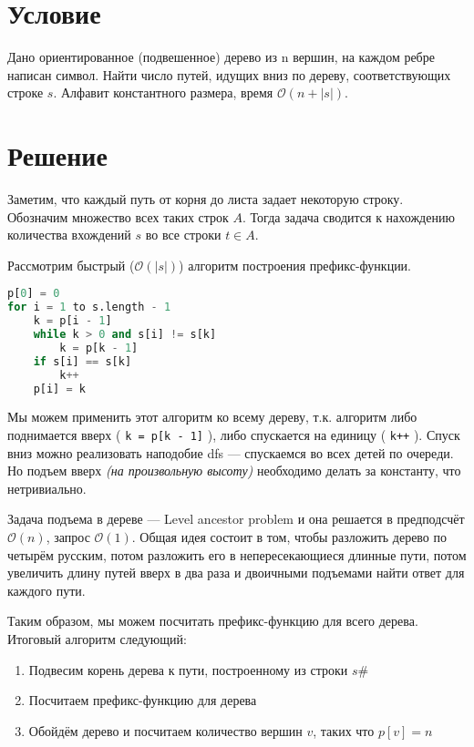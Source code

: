 

\usepackage{listings}

\lstset{basicstyle=\ttfamily,breaklines=true}

\setmonofont{Inconsolata}

\cfoot{}



\section{Условие}

Дано ориентированное (подвешенное) дерево из n вершин, на каждом ребре написан символ. Найти число путей, идущих вниз по дереву, соответствующих строке $s$. Алфавит константного размера, время \(\mathcal{O}(n + |s|)\).

\section{Решение}

Заметим, что каждый путь от корня до листа задает некоторую строку. Обозначим множество всех таких строк \(A\). Тогда задача сводится к нахождению количества вхождений \(s\) во все строки \(t\in A\).

Рассмотрим быстрый (\(\mathcal{O}(|s|)\)) алгоритм построения префикс-функции.

\begin{lstlisting}[language=Python]
p[0] = 0
for i = 1 to s.length - 1
    k = p[i - 1]
    while k > 0 and s[i] != s[k]
        k = p[k - 1]
    if s[i] == s[k]
        k++
    p[i] = k
\end{lstlisting}

Мы можем применить этот алгоритм ко всему дереву, т.к. алгоритм либо поднимается вверх ( \texttt{k = p[k - 1]} ), либо спускается на единицу ( \texttt{k++} ). Спуск вниз можно реализовать наподобие dfs --- спускаемся во всех детей по очереди. Но подъем вверх \textit{(на произвольную высоту)} необходимо делать за константу, что нетривиально.

Задача подъема в дереве --- Level ancestor problem и она решается в предподсчёт \(\mathcal{O}(n)\), запрос \(\mathcal{O}(1)\). Общая идея состоит в том, чтобы разложить дерево по четырём русским, потом разложить его в непересекающиеся длинные пути, потом увеличить длину путей вверх в два раза и двоичными подъемами найти ответ для каждого пути.

Таким образом, мы можем посчитать префикс-функцию для всего дерева. Итоговый алгоритм следующий:
\begin{enumerate}
    \item Подвесим корень дерева к пути, построенному из строки \(s\#\)
    \item Посчитаем префикс-функцию для дерева
    \item Обойдём дерево и посчитаем количество вершин \(v\), таких что \(p[v] = n\)
\end{enumerate}



